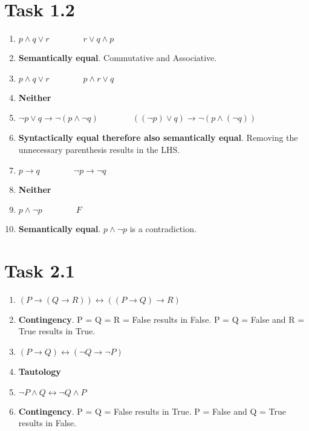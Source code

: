 \documentclass{article}
\newcommand{\answer}{\item[]} %
\begin{document}
	\section{Task 1.2}
		\begin{enumerate}[label={(\alph*)}]
			
			\item $p \land q \lor r \qquad \qquad r \lor q \land p$
			\answer \textbf{Semantically equal}.  Commutative and Associative.
			
			\item $p \land q \lor r \qquad \qquad p \land r \lor q$
			\answer \textbf{Neither}
			
			\item $\neg p \lor q \to \neg(p \land \neg q) \qquad \qquad ((\neg p) \lor q) \to \neg (p \land (\neg q))$
			\answer \textbf{Syntactically equal therefore also semantically equal}. Removing the unnecessary parenthesis results in the LHS.
			
			\item $p \to q \qquad \qquad \neg p \to \neg q$
			\answer \textbf{Neither}
			
			\item $p \land \neg p \qquad \qquad F$
			\answer \textbf{Semantically equal}. $p \land \neg p$ is a contradiction. 
			
		\end{enumerate}
		
	\pagebreak
	
	\section{Task 2.1}
		\begin{enumerate}[label = {(\alph*)}]
			
			\item $(P \to (Q \to R)) \leftrightarrow ((P \to Q) \to R)$
			\answer \textbf{Contingency}. P = Q = R = False results in False. P = Q = False and R = True results in True.
			
			\item $(P \to Q) \leftrightarrow (\neg Q \to \neg P)$
			\answer \textbf{Tautology}
			
			\item $\neg P \land Q \leftrightarrow \neg Q \land P$
			\answer \textbf{Contingency}. P = Q = False results in True. P = False and Q = True results in False.
			
		\end{enumerate}
	
\end{document}
